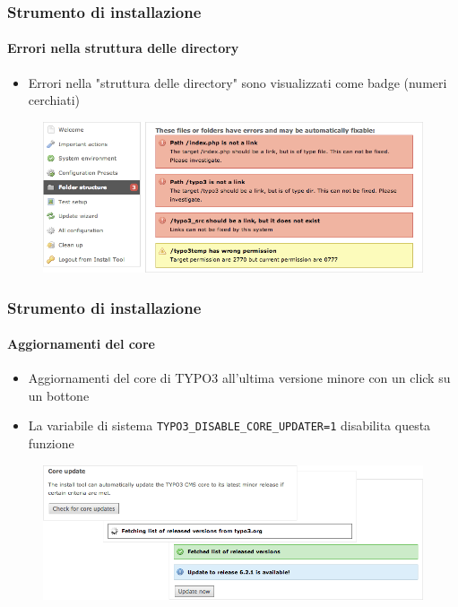 
\begin{frame}[fragile]
	\frametitle{Strumento di installazione}
	\framesubtitle{Errori nella struttura delle directory}

	\begin{itemize}
		\item Errori nella "struttura delle directory" sono visualizzati come badge (numeri cerchiati)
	\end{itemize}

	\begin{figure}
		\includegraphics[width=0.95\linewidth]{Images/InstallTool/ErrorsInFolderStructure.png}
	\end{figure}

\end{frame}


\begin{frame}[fragile]
	\frametitle{Strumento di installazione}
	\framesubtitle{Aggiornamenti del core}

	\begin{itemize}
		\item Aggiornamenti del core di TYPO3 all'ultima versione minore con un click su un bottone 
		\item La variabile di sistema \texttt{TYPO3\_DISABLE\_CORE\_UPDATER=1} disabilita questa funzione
	\end{itemize}

	\begin{figure}
		\includegraphics[width=0.95\linewidth]{Images/InstallTool/CoreUpdate.png}
	\end{figure}

\end{frame}

